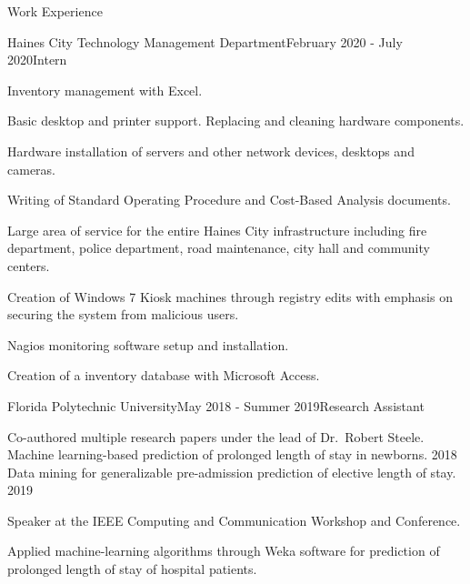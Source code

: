 \documentclass{resume} %
\begin{document}
\begin{rSection}{Work Experience}

\begin{rSubsection}{Haines City Technology Management Department}{February 2020 - July 2020}{Intern}{}
	\item Inventory management with Excel. 
	\item Basic desktop and printer support. Replacing and cleaning hardware components.
	\item Hardware installation of servers and other network devices, desktops and cameras.
	\item Writing of Standard Operating Procedure and Cost-Based Analysis documents.
	\item Large area of service for the entire Haines City infrastructure including fire department, police department, road maintenance, city hall and community centers.
	\item Creation of Windows 7 Kiosk machines through registry edits with emphasis on securing the system from malicious users.
	\item Nagios monitoring software setup and installation.
	\item Creation of a inventory database with Microsoft Access.
\end{rSubsection}

\begin{rSubsection}{Florida Polytechnic University}{May 2018 - Summer 2019}{Research Assistant}{}
	\item Co-authored multiple research papers under the lead of Dr.\ Robert Steele.\\
	Machine learning-based prediction of prolonged length of stay in newborns. 2018\\
	Data mining for generalizable pre-admission prediction of elective length of stay. 2019
	\item Speaker at the IEEE Computing and Communication Workshop and Conference.
	\item Applied machine-learning algorithms through Weka software for prediction of prolonged length of stay of hospital patients.
\end{rSubsection}

\end{rSection}

\newpage

\end{document}
